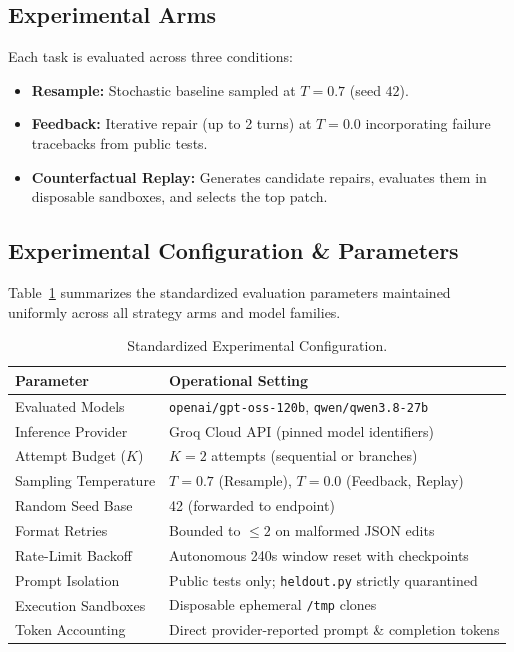 \documentclass[10pt,twocolumn,letterpaper]{article}
\begin{document}
\subsection{Experimental Arms}
Each task is evaluated across three conditions:
\begin{itemize}
    \item \textbf{Resample:} Stochastic baseline sampled at $T = 0.7$ (seed $42$).
    \item \textbf{Feedback:} Iterative repair (up to 2 turns) at $T = 0.0$ incorporating failure tracebacks from public tests.
    \item \textbf{Counterfactual Replay:} Generates candidate repairs, evaluates them in disposable sandboxes, and selects the top patch.
\end{itemize}

\subsection{Experimental Configuration \& Parameters}
Table~\ref{tab:config} summarizes the standardized evaluation parameters maintained uniformly across all strategy arms and model families.

\begin{table}[h]
\centering
\small
\caption{Standardized Experimental Configuration.}
\label{tab:config}
\begin{tabular}{ll}
\toprule
\textbf{Parameter} & \textbf{Operational Setting} \\
\midrule
Evaluated Models & \texttt{openai/gpt-oss-120b}, \texttt{qwen/qwen3.8-27b} \\
Inference Provider & Groq Cloud API (pinned model identifiers) \\
Attempt Budget ($K$) & $K = 2$ attempts (sequential or branches) \\
Sampling Temperature & $T = 0.7$ (Resample), $T = 0.0$ (Feedback, Replay) \\
Random Seed Base & 42 (forwarded to endpoint) \\
Format Retries & Bounded to $\le 2$ on malformed JSON edits \\
Rate-Limit Backoff & Autonomous 240s window reset with checkpoints \\
Prompt Isolation & Public tests only; \texttt{heldout.py} strictly quarantined \\
Execution Sandboxes & Disposable ephemeral \texttt{/tmp} clones \\
Token Accounting & Direct provider-reported prompt \& completion tokens \\
\bottomrule
\end{tabular}
\end{table}
\end{document}
